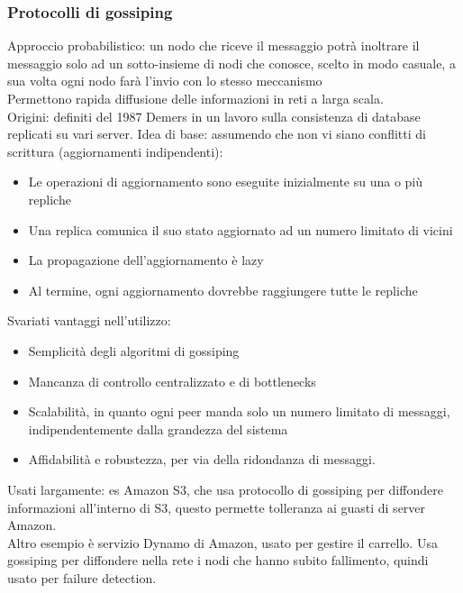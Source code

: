 \documentclass[16px]{article}
\begin{document}
\subsubsection{Protocolli di gossiping}
Approccio probabilistico: un nodo che riceve il messaggio potrà inoltrare il messaggio solo ad un sotto-insieme di nodi che conosce, scelto in modo casuale, a sua volta ogni nodo farà l'invio con lo stesso meccanismo\\ Permettono rapida diffusione delle informazioni in reti a larga scala.\\ Origini: definiti del 1987 Demers in un lavoro sulla consistenza di database replicati su vari server. Idea di base: assumendo che non vi siano conflitti di scrittura (aggiornamenti indipendenti):
\begin{itemize}
\item Le operazioni di aggiornamento sono eseguite inizialmente su una o più repliche
\item Una replica comunica il suo stato aggiornato ad un numero limitato di vicini
\item La propagazione dell'aggiornamento è lazy
\item Al termine, ogni aggiornamento dovrebbe raggiungere tutte le repliche
\end{itemize}
Svariati vantaggi nell'utilizzo:
\begin{itemize}
\item Semplicità degli algoritmi di gossiping
\item Mancanza di controllo centralizzato e di bottlenecks
\item Scalabilità, in quanto ogni peer manda solo un numero limitato di messaggi, indipendentemente dalla grandezza del sistema
\item Affidabilità e robustezza, per via della ridondanza di messaggi.
\end{itemize}
Usati largamente: es Amazon S3, che usa protocollo di gossiping per diffondere informazioni all'interno di S3, questo permette tolleranza ai guasti di server Amazon.\\ Altro esempio è servizio Dynamo di Amazon, usato per gestire il carrello. Usa gossiping per diffondere nella rete i nodi che hanno subito fallimento, quindi usato per failure detection.
\end{document}
